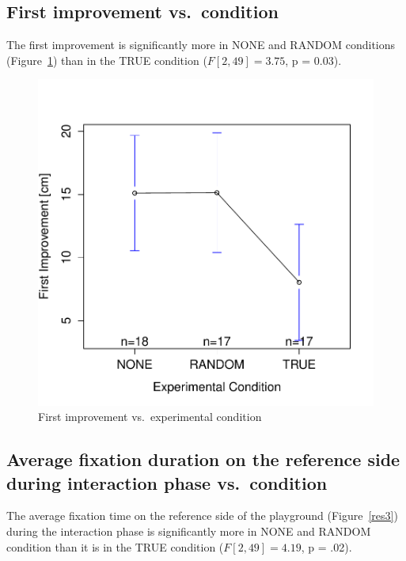 \documentclass{sig-alternate}
\begin{document}
\subsection{First improvement vs.~condition}

The first improvement is significantly more in {\sf NONE} and {\sf RANDOM}
conditions (Figure~\ref{res2}) than in the {\sf TRUE} condition ($F[2,49]=3.75$, p =
0.03).

\begin{figure}[h!]
    \centering
    \includegraphics[width=0.8\linewidth]{meanPlotFirstImprove}
    \caption{First improvement vs.~experimental condition}
    \label{res2}
\end{figure}

\subsection{Average fixation duration on the reference side during interaction
phase vs.~condition}

The average fixation time on the reference side of the playground
(Figure~\ref{res3}) during the interaction phase is significantly more in {\sf NONE}
and {\sf RANDOM} condition than it is in the {\sf TRUE} condition ($F[2,49]=4.19$,
p = .02).
\end{document}
